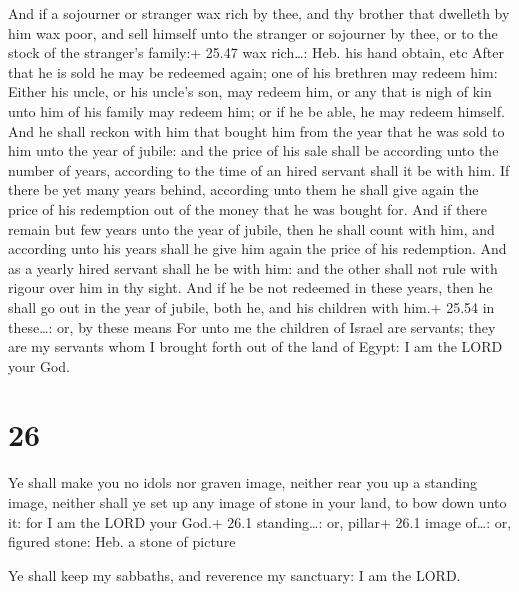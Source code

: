  And if a sojourner or stranger wax rich by thee, and thy
brother that dwelleth by him wax poor, and sell himself unto the
stranger or sojourner by thee, or to the stock of the stranger's
family:+ 25.47 wax rich\ldots: Heb. his hand obtain, etc 
After that he is sold he may be redeemed again; one of his brethren may
redeem him:  Either his uncle, or his uncle's son, may
redeem him, or any that is nigh of kin unto him of his family may redeem
him; or if he be able, he may redeem himself.  And he shall
reckon with him that bought him from the year that he was sold to him
unto the year of jubile: and the price of his sale shall be according
unto the number of years, according to the time of an hired servant
shall it be with him.  If there be yet many years behind,
according unto them he shall give again the price of his redemption out
of the money that he was bought for.  And if there remain
but few years unto the year of jubile, then he shall count with him, and
according unto his years shall he give him again the price of his
redemption.  And as a yearly hired servant shall he be with
him: and the other shall not rule with rigour over him in thy sight.
 And if he be not redeemed in these years, then he shall go
out in the year of jubile, both he, and his children with him.+ 25.54 in
these\ldots: or, by these means  For unto me the children
of Israel are servants; they are my servants whom I brought forth out of
the land of Egypt: I am the LORD your God.

\hypertarget{section-25}{%
\section{26}\label{section-25}}

 Ye shall make you no idols nor graven image, neither rear
you up a standing image, neither shall ye set up any image of stone in
your land, to bow down unto it: for I am the LORD your God.+ 26.1
standing\ldots: or, pillar+ 26.1 image of\ldots: or, figured stone: Heb.
a stone of picture

 Ye shall keep my sabbaths, and reverence my sanctuary: I
am the LORD.

